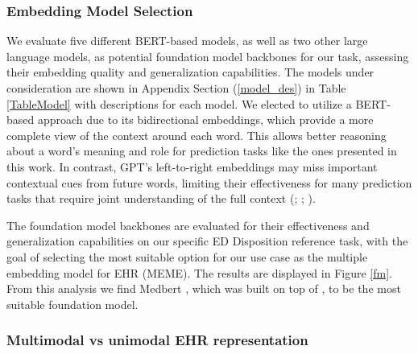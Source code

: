 \documentclass{article}
\theoremstyle{plain}
\theoremstyle{definition}
\theoremstyle{remark}
\begin{document}
\subsubsection{Embedding Model Selection}

We evaluate five different BERT-based models, as well as two other large language models, as potential foundation model backbones for our task, assessing their embedding quality and generalization capabilities. The models under consideration are shown in Appendix Section (\ref{model_des}) in Table \ref{TableModel} with descriptions for each model. We elected to utilize a BERT-based approach due to its bidirectional embeddings, which provide a more complete view of the context around each word. This allows better reasoning about a word's meaning and role for prediction tasks like the ones presented in this work. In contrast, GPT's left-to-right embeddings may miss important contextual cues from future words, limiting their effectiveness for many prediction tasks that require joint understanding of the full context (\cite{ethayarajh2019contextual}; \cite{schomacker2021language}; \cite{topal2021exploring}).

The foundation model backbones are evaluated for their effectiveness and generalization capabilities on our specific ED Disposition reference task, with the goal of selecting the most suitable option for our use case as the multiple embedding model for EHR (MEME). The results are displayed in Figure \ref{fm}. From this analysis we find Medbert \citep{9980157}, which was built on top of \citep{alsentzer2019publicly}, to be the most suitable foundation model.

\subsubsection{Multimodal vs unimodal EHR representation}
\end{document}
